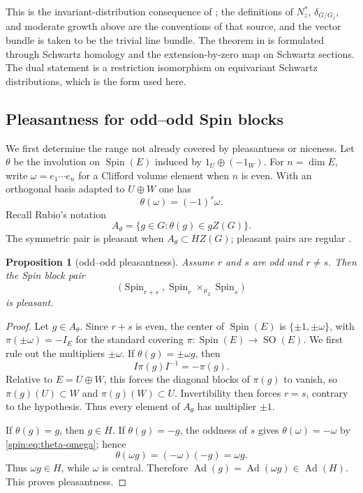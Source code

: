 \documentclass[10pt,a4paper]{amsart}
\numberwithin{equation}{section}
\newtheorem{proposition}[theorem]{Proposition}
\newcommand{\Spin}{\operatorname{Spin}}
\newcommand{\SO}{\operatorname{SO}}
\newcommand{\Ad}{\operatorname{Ad}}
\begin{document}
This is the invariant-distribution consequence of
\cite[Theorems~1.12--1.13]{ChenSun}; the definitions of $N_z^*$,
$\delta_{G/G_z}$, and moderate growth above are the conventions of that
source, and the vector bundle is taken to be the trivial line bundle.  The theorem in \cite{ChenSun} is formulated through
Schwartz homology and the extension-by-zero map on Schwartz sections.  The
dual statement is a restriction isomorphism on equivariant Schwartz
distributions, which is the form used here.

\subsection{Pleasantness for odd--odd Spin blocks}\label{spin:sec:indexing}

We first determine the range not already covered by pleasantness or niceness.  Let $\theta$ be the involution on $\Spin(E)$ induced by
$1_U\oplus(-1_W)$.  For $n=\dim E$, write $\omega=e_1\cdots e_n$ for a
Clifford volume element when $n$ is even.  With an orthogonal basis adapted to
$U\oplus W$ one has
\begin{equation}\label{spin:eq:theta-omega}
  \theta(\omega)=(-1)^s\omega.
\end{equation}
Recall Rubio's notation
\[
  A_\theta=\{g\in G:\theta(g)\in gZ(G)\}.
\]
The symmetric pair is pleasant when $A_\theta\subset HZ(G)$; pleasant pairs
are regular \cite[Lemma~4.2]{Rubio}.

\begin{proposition}[odd--odd pleasantness]\label{spin:prop:pleasant}
Assume $r$ and $s$ are odd and $r\ne s$.  Then the Spin block pair
\[
  \bigl(\Spin_{r+s},\Spin_r\times_{\mu_2}\Spin_s\bigr)
\]
is pleasant.
\end{proposition}

\begin{proof}
Let $g\in A_\theta$.  Since $r+s$ is even, the center of $\Spin(E)$ is
$\{\pm1,\pm\omega\}$, with $\pi(\pm\omega)=-I_E$ for the standard covering
$\pi:\Spin(E)\to\SO(E)$.  We first rule out the multipliers $\pm\omega$.
If $\theta(g)=\pm\omega g$, then
\[
  I\pi(g)I^{-1}=-\pi(g).
\]
Relative to $E=U\oplus W$, this forces the diagonal blocks of $\pi(g)$ to
vanish, so $\pi(g)(U)\subset W$ and $\pi(g)(W)\subset U$.  Invertibility
then forces $r=s$, contrary to the hypothesis.  Thus every element of
$A_\theta$ has multiplier $\pm1$.

If $\theta(g)=g$, then $g\in H$.  If $\theta(g)=-g$, the oddness of $s$
gives $\theta(\omega)=-\omega$ by \eqref{spin:eq:theta-omega}; hence
\[
  \theta(\omega g)=(-\omega)(-g)=\omega g.
\]
Thus $\omega g\in H$, while $\omega$ is central.  Therefore
$\Ad(g)=\Ad(\omega g)\in\Ad(H)$.  This proves pleasantness.
\end{proof}
\end{document}
